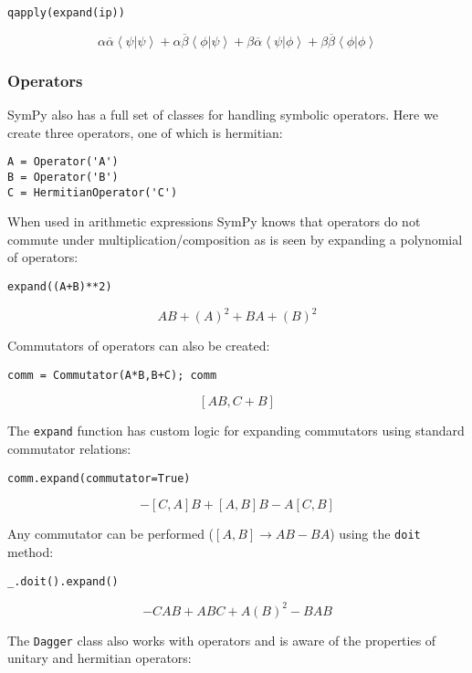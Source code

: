\begin{verbatim}
qapply(expand(ip))
\end{verbatim}
$$\alpha \overline{\alpha} \left\langle \psi \right. {\left|\psi\right\rangle } + \alpha \overline{\beta} \left\langle \phi \right. {\left|\psi\right\rangle } + \beta \overline{\alpha} \left\langle \psi \right. {\left|\phi\right\rangle } + \beta \overline{\beta} \left\langle \phi \right. {\left|\phi\right\rangle }$$

\subsubsection{Operators}

SymPy also has a full set of classes for handling symbolic operators.  Here we
create three operators, one of which is hermitian:

\begin{verbatim}
A = Operator('A')
B = Operator('B')
C = HermitianOperator('C')
\end{verbatim}

When used in arithmetic expressions SymPy knows that operators do not commute
under multiplication/composition as is seen by expanding a polynomial of
operators:

\begin{verbatim}
expand((A+B)**2)
\end{verbatim}
$$A B + \left(A\right)^{2} + B A + \left(B\right)^{2}$$

Commutators of operators can also be created:

\begin{verbatim}
comm = Commutator(A*B,B+C); comm
\end{verbatim}
$$\left[A B,C + B\right]$$

The \verb:expand: function has custom logic for expanding commutators using
standard commutator relations:

\begin{verbatim}
comm.expand(commutator=True)
\end{verbatim}
$$- \left[C,A\right] B + \left[A,B\right] B - A \left[C,B\right]$$

Any commutator can be performed ($[A,B]\rightarrow AB-BA$) using the \verb:doit:
method:

\begin{verbatim}
_.doit().expand()
\end{verbatim}
$$- C A B + A B C + A \left(B\right)^{2} - B A B$$

The \verb:Dagger: class also works with operators and is aware of the properties
of unitary and hermitian operators:

